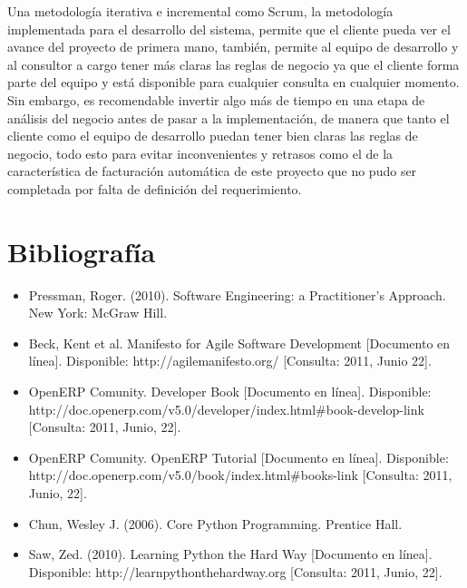 \documentclass[a4paper, 12pt]{article}
\begin{document}
Una metodología iterativa e incremental como Scrum, la metodología implementada para el desarrollo del sistema, permite que el cliente pueda ver el avance del proyecto de primera mano, también, permite al equipo de desarrollo y al consultor a cargo tener más claras las reglas de negocio ya que el cliente forma parte del equipo y está disponible para cualquier consulta en cualquier momento. Sin embargo, es recomendable invertir algo más de tiempo en una etapa de análisis del negocio antes de pasar a la implementación, de manera que tanto el cliente como el equipo de desarrollo puedan tener bien claras las reglas de negocio, todo esto para evitar inconvenientes y retrasos como el de la característica de facturación automática de este proyecto que no pudo ser completada por falta de definición del requerimiento.

\newpage
\section{Bibliografía}
\begin{itemize}
    \item Pressman, Roger. (2010). Software Engineering: a Practitioner's Approach. New York: McGraw Hill.
    \item Beck, Kent et al. Manifesto for Agile Software Development [Documento en línea]. Disponible: http://agilemanifesto.org/ [Consulta: 2011, Junio 22].
    \item OpenERP Comunity. Developer Book [Documento en línea]. Disponible: http://doc.openerp.com/v5.0/developer/index.html\#book-develop-link [Consulta: 2011, Junio, 22].
    \item OpenERP Comunity. OpenERP Tutorial [Documento en línea]. Disponible: http://doc.openerp.com/v5.0/book/index.html\#books-link [Consulta: 2011, Junio, 22].
    \item Chun, Wesley J. (2006). Core Python Programming. Prentice Hall.
    \item Saw, Zed. (2010). Learning Python the Hard Way [Documento en línea]. Disponible: http://learnpythonthehardway.org [Consulta: 2011, Junio, 22].
\end{itemize}
\end{document}
